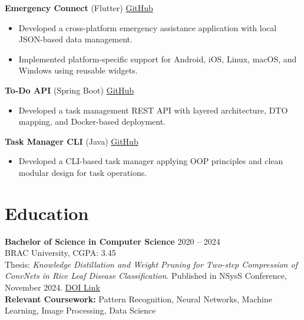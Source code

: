 \documentclass[11pt,a4paper]{article}
\begin{document}
\vspace{4pt}
\textbf{Emergency Connect} (Flutter) \hfill \href{https://github.com/amhrahat/emergency-connect}{GitHub}
\begin{itemize}
    \item Developed a cross-platform emergency assistance application with local JSON-based data management.
    \item Implemented platform-specific support for Android, iOS, Linux, macOS, and Windows using reusable widgets.
\end{itemize}

\vspace{4pt}
\textbf{To-Do API} (Spring Boot) \hfill \href{https://github.com/amhrahat/SpringBoot-To-Do-App}{GitHub}
\begin{itemize}
    \item Developed a task management REST API with layered architecture, DTO mapping, and Docker-based deployment.
\end{itemize}

\vspace{4pt}
\textbf{Task Manager CLI} (Java) \hfill \href{https://github.com/amhrahat/Task-Manager}{GitHub}
\begin{itemize}
    \item Developed a CLI-based task manager applying OOP principles and clean modular design for task operations.
\end{itemize}


\section*{Education}
\textbf{Bachelor of Science in Computer Science} \hfill 2020 -- 2024\\
BRAC University, CGPA: 3.45\\
Thesis: \textit{Knowledge Distillation and Weight Pruning for Two-step Compression of ConvNets in Rice Leaf Disease Classification}. Published in NSysS Conference, November 2024. \href{https://dl.acm.org/doi/10.1145/3704522.3704525}{DOI Link}\\
\textbf{Relevant Coursework:} Pattern Recognition, Neural Networks, Machine Learning, Image Processing, Data Science
\end{document}
